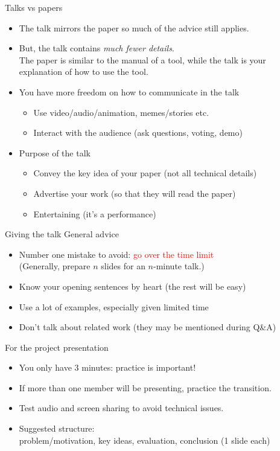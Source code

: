 \documentclass[usenames,dvipsnames,notes]{beamer}
\begin{document}
\begin{frame}
    {Talks vs papers}
    \begin{itemize}
        \item The talk mirrors the paper so much of the advice still applies.
        \item But, the talk contains \emph{much fewer details}.\\
            The paper is similar to the manual of a tool,
            while the talk is your explanation of how to use the tool.
        \item You have more freedom on how to communicate in the talk
            \begin{itemize}
                \item Use video/audio/animation, memes/stories etc.
                \item Interact with the audience (ask questions, voting, demo)
            \end{itemize}
        \item Purpose of the talk
        \begin{itemize}
            \item Convey the key idea of your paper (not all technical details)
            \item Advertise your work (so that they will read the paper)
            \item Entertaining (it's a performance)
        \end{itemize}
    \end{itemize}
\end{frame}

\begin{frame}
    {Giving the talk}
    General advice\\
    \begin{itemize}
        \item Number one mistake to avoid: \textcolor{red}{go over the time limit}\\
            (Generally, prepare $n$ slides for an $n$-minute talk.)
        \item Know your opening sentences by heart (the rest will be easy)
        \item Use a lot of examples, especially given limited time
        \item Don't talk about related work (they may be mentioned during Q\&A)
    \end{itemize}
    For the project presentation\\
    \begin{itemize}
        \item You only have 3 minutes: practice is important!  
        \item If more than one member will be presenting, practice the transition.
        \item Test audio and screen sharing to avoid technical issues.
        \item Suggested structure:\\
            problem/motivation, key ideas, evaluation, conclusion (1 slide each)
    \end{itemize}
\end{frame}
\end{document}
